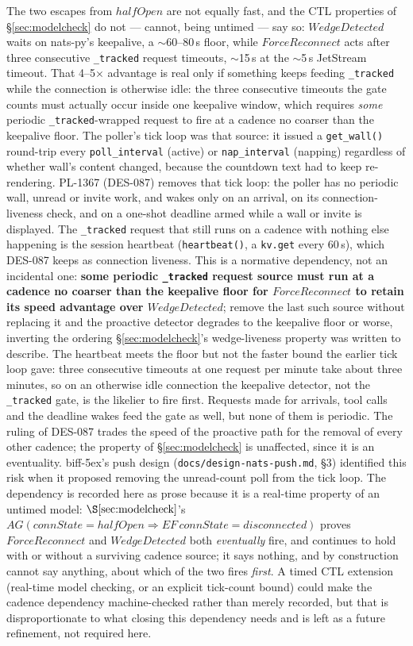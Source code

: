 \documentclass[a4paper,10pt,fleqn]{article}
\begin{document}
The two escapes from $halfOpen$ are not equally fast, and the CTL
properties of \S\ref{sec:modelcheck} do not --- cannot, being untimed ---
say so: $WedgeDetected$ waits on nats-py's keepalive, a $\sim$60--80\,s
floor, while $ForceReconnect$ acts after three consecutive
\texttt{\_tracked} request timeouts, $\sim$15\,s at the $\sim$5\,s
JetStream timeout.  That 4--5$\times$ advantage is real only if something
keeps feeding \texttt{\_tracked} while the connection is otherwise idle:
the three consecutive timeouts the gate counts must actually occur inside
one keepalive window, which requires \emph{some} periodic
\texttt{\_tracked}-wrapped request to fire at a cadence no coarser than
the keepalive floor.  The poller's tick loop was that source: it issued a
\texttt{get\_wall()} round-trip every \texttt{poll\_interval} (active) or
\texttt{nap\_interval} (napping) regardless of whether wall's content
changed, because the countdown text had to keep re-rendering.  PL-1367
(DES-087) removes that tick loop: the poller has no periodic wall, unread or
invite work, and wakes only on an arrival, on its connection-liveness check,
and on a one-shot deadline armed while a wall or invite is displayed.  The
\texttt{\_tracked} request that still runs on a cadence with nothing else
happening is the session heartbeat (\texttt{heartbeat()}, a \texttt{kv.get}
every 60\,s), which DES-087 keeps as connection liveness.  This is a
normative dependency, not an incidental one: \textbf{some periodic
\texttt{\_tracked} request source must run at a cadence no coarser than
the keepalive floor for $ForceReconnect$ to retain its speed advantage over
$WedgeDetected$}; remove the last such source without replacing it and the
proactive detector degrades to the keepalive floor or worse, inverting the
ordering \S\ref{sec:modelcheck}'s wedge-liveness property was written to
describe.  The heartbeat meets the floor but not the faster bound the
earlier tick loop gave: three consecutive timeouts at one request per minute
take about three minutes, so on an otherwise idle connection the keepalive
detector, not the \texttt{\_tracked} gate, is the likelier to fire first.
Requests made for arrivals, tool calls and the deadline wakes feed the gate
as well, but none of them is periodic.  The ruling of DES-087 trades the
speed of the proactive path for the removal of every other cadence; the
property of \S\ref{sec:modelcheck} is unaffected, since it is an
eventuality.  biff-5ex's push design
(\texttt{docs/design-nats-push.md}, \S3) identified this risk when it
proposed removing the unread-count poll from the tick loop.  The dependency is
recorded here as prose because it is a real-time property of an untimed
model: $\S\ref{sec:modelcheck}$'s $AG(connState = halfOpen \Rightarrow
EF\,connState = disconnected)$ proves $ForceReconnect$ and $WedgeDetected$
both \emph{eventually} fire, and continues to hold with or without a
surviving cadence source; it says nothing, and by construction cannot say
anything, about which of the two fires \emph{first}.  A timed CTL
extension (real-time model checking, or an explicit tick-count bound) could
make the cadence dependency machine-checked rather than merely recorded,
but that is disproportionate to what closing this dependency needs and is
left as a future refinement, not required here.
\end{document}
